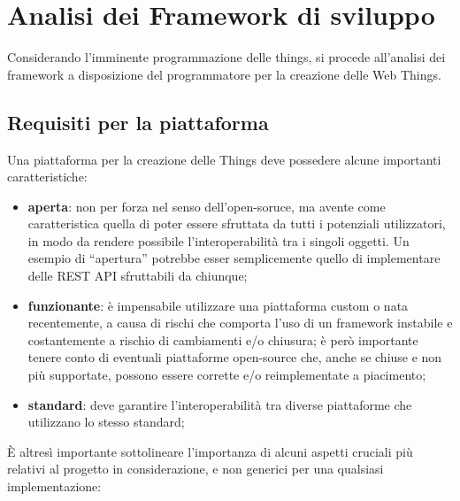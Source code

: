 \documentclass[12pt,a4paper,openright,oneside]{report}
\newcommand{\quotes}[1]{``#1''}
\begin{document}
\clearpage{\pagestyle{empty}\cleardoublepage}
\chapter{Analisi dei Framework di sviluppo}           %
\lhead[\fancyplain{}{\bfseries\thepage}]{\fancyplain{}{\bfseries\rightmark}}  

Considerando l'imminente programmazione delle things, si procede all'analisi dei framework a disposizione del programmatore per la creazione delle Web Things.

\section{Requisiti per la piattaforma}
\label{sec:iot_platform}
Una piattaforma per la creazione delle Things deve possedere alcune importanti caratteristiche:

\begin{itemize}
	\setlength\itemsep{0em}
	\item \textbf{aperta}: non per forza nel senso dell'open-soruce, ma avente come caratteristica quella di poter essere sfruttata da tutti i potenziali utilizzatori, in modo da rendere possibile l'interoperabilità tra i singoli oggetti. Un esempio di \quotes{apertura} potrebbe esser semplicemente quello di implementare delle REST API sfruttabili da chiunque;

	\item \textbf{funzionante}: è impensabile utilizzare una piattaforma custom o nata recentemente, a causa di rischi che comporta l'uso di un framework instabile e costantemente a rischio di cambiamenti e/o chiusura; è però importante tenere conto di eventuali piattaforme open-source che, anche se chiuse e non più supportate, possono essere corrette e/o reimplementate a piacimento;
	
	\item \textbf{standard}: deve garantire l'interoperabilità tra diverse piattaforme che utilizzano lo stesso standard;
\end{itemize}

È altresì importante sottolineare l'importanza di alcuni aspetti cruciali più relativi al progetto in considerazione, e non generici per una qualsiasi implementazione:
\end{document}
